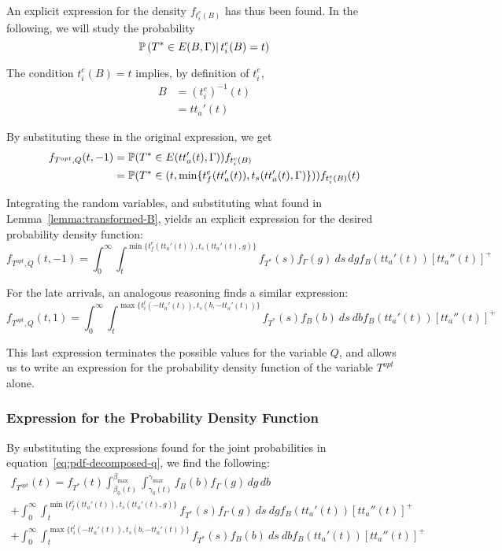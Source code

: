 An explicit expression for the density \(f_{t_i^e(B)}\) has thus been found.
In the following, we will study the probability
\begin{equation*}
  \mathbb{P}\left(T^* \in E(B, \Gamma)|\, t_i^e(B) = t\right)
\end{equation*}

The condition \(t_i^e(B) = t\) implies, by definition of \(t_i^e\),
\begin{align*}
  B & = (t_i^e)^{-1}(t) \\
    & = tt_a'(t)
\end{align*}

By substituting these in the original expression, we get
\begin{equation}
  \label{eq:early-subst}
  \begin{split}
    f_{T^{opt}, Q}(t, -1) & = \mathbb{P}(T^* \in E(tt_a'(t), \Gamma))f_{t_i^e(B)}\\
    & = \mathbb{P}(T^* \in (t, \min\{t_f^e(tt_a'(t)), t_s(tt_a'(t), \Gamma)\}))f_{t_i^e(B)}(t)
  \end{split}
\end{equation}

Integrating the random variables,
and substituting what found in Lemma~\ref{lemma:transformed-B},
yields an explicit expression for the desired probability density function:
\begin{equation}
  \label{eq:early-final}
  f_{T^{opt}, Q}(t, -1) = \int_0^\infty \int_t^{\min\{t_f^e(tt_a'(t)), t_s(tt_a'(t), g)\}}f_{T^*}(s) f_\Gamma(g)\ ds\ dg f_B(tt_a'(t)) [tt_a''(t)]^+
\end{equation}

For the late arrivals, an analogous reasoning finds a similar expression:
\begin{equation}
  \label{eq:late-final}
  f_{T^{opt}, Q}(t, 1) = \int_0^\infty \int_t^{\max\{t_i^l(-tt_a'(t)), t_s(b, -tt_a'(t))\}}f_{T^*}(s) f_B(b)\ ds\ db f_B(tt_a'(t)) [tt_a''(t)]^+
\end{equation}

This last expression terminates the possible values for the variable \(Q\),
and allows us to write an expression for the probability density function of the variable \(T^{opt}\) alone.

\subsubsection{Expression for the Probability Density Function}

By substituting the expressions found for the joint probabilities in equation~\eqref{eq:pdf-decomposed-q},
we find the following:
\begin{multline}
  \label{eq:pdf-final}
    f_{T^{opt}}(t) = f_{T^*}(t)\int_{\beta_0(t)}^{\beta_{\text{max}}}\int_{\gamma_0(t)}^{\gamma_{\text{max}}}f_B(b)f_\Gamma(g)\, dg\, db \\
    + \int_0^\infty \int_t^{\min\{t_f^e(tt_a'(t)), t_s(tt_a'(t), g)\}}f_{T^*}(s) f_\Gamma(g)\ ds\ dg f_B(tt_a'(t)) [tt_a''(t)]^+ \\
    + \int_0^\infty \int_t^{\max\{t_i^l(-tt_a'(t)), t_s(b, -tt_a'(t))\}}f_{T^*}(s) f_B(b)\ ds\ db f_B(tt_a'(t)) [tt_a''(t)]^+
\end{multline}

